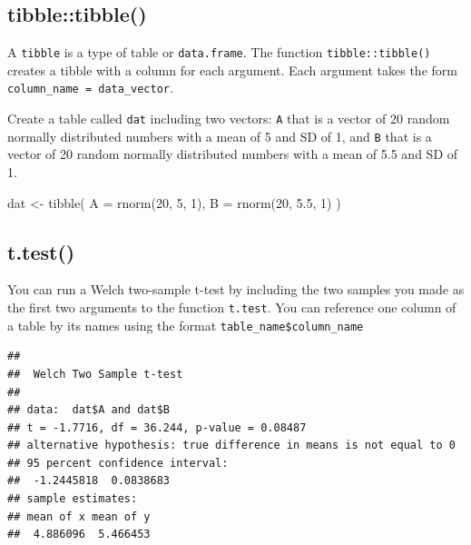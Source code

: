 \documentclass[
  oneside]{book}
\newenvironment{Shaded}{\begin{snugshade}}{\end{snugshade}}
\newcommand{\AttributeTok}[1]{\textcolor[rgb]{0.77,0.63,0.00}{#1}}
\newcommand{\DecValTok}[1]{\textcolor[rgb]{0.00,0.00,0.81}{#1}}
\newcommand{\FloatTok}[1]{\textcolor[rgb]{0.00,0.00,0.81}{#1}}
\newcommand{\FunctionTok}[1]{\textcolor[rgb]{0.00,0.00,0.00}{#1}}
\newcommand{\NormalTok}[1]{#1}
\newcommand{\OtherTok}[1]{\textcolor[rgb]{0.56,0.35,0.01}{#1}}
\newcommand{\SpecialCharTok}[1]{\textcolor[rgb]{0.00,0.00,0.00}{#1}}
\begin{document}
\hypertarget{tibbletibble}{%
\subsection{tibble::tibble()}\label{tibbletibble}}

A \texttt{tibble} is a type of table or \texttt{data.frame}. The function \texttt{tibble::tibble()} creates a tibble with a column for each argument. Each argument takes the form \texttt{column\_name\ =\ data\_vector}.

Create a table called \texttt{dat} including two vectors: \texttt{A} that is a vector of 20 random normally distributed numbers with a mean of 5 and SD of 1, and \texttt{B} that is a vector of 20 random normally distributed numbers with a mean of 5.5 and SD of 1.

\begin{Shaded}
\begin{Highlighting}[]
\NormalTok{dat }\OtherTok{\textless{}{-}} \FunctionTok{tibble}\NormalTok{(}
  \AttributeTok{A =} \FunctionTok{rnorm}\NormalTok{(}\DecValTok{20}\NormalTok{, }\DecValTok{5}\NormalTok{, }\DecValTok{1}\NormalTok{),}
  \AttributeTok{B =} \FunctionTok{rnorm}\NormalTok{(}\DecValTok{20}\NormalTok{, }\FloatTok{5.5}\NormalTok{, }\DecValTok{1}\NormalTok{)}
\NormalTok{)}
\end{Highlighting}
\end{Shaded}

\hypertarget{t.test}{%
\subsection{t.test()}\label{t.test}}

You can run a Welch two-sample t-test by including the two samples you made as the first two arguments to the function \texttt{t.test}. You can reference one column of a table by its names using the format \texttt{table\_name\$column\_name}

\begin{Shaded}
\end{Shaded}

\begin{verbatim}
## 
##  Welch Two Sample t-test
## 
## data:  dat$A and dat$B
## t = -1.7716, df = 36.244, p-value = 0.08487
## alternative hypothesis: true difference in means is not equal to 0
## 95 percent confidence interval:
##  -1.2445818  0.0838683
## sample estimates:
## mean of x mean of y 
##  4.886096  5.466453
\end{verbatim}
\end{document}
